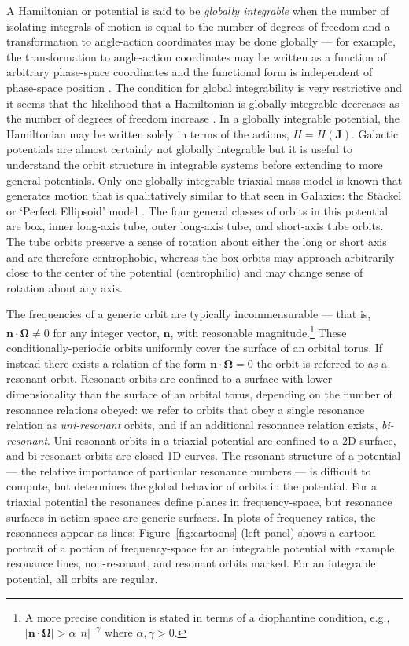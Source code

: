 \documentclass[letterpaper,12pt,preprint]{aastex}
\newcommand{\bs}[1]{\boldsymbol{#1}}
\begin{document}
A Hamiltonian or potential is said to be \emph{globally integrable} when the number of isolating integrals of motion is equal to the number of degrees of freedom and a transformation to angle-action coordinates may be done globally --- for example, the transformation to angle-action coordinates may be written as a function of arbitrary phase-space coordinates and the functional form is independent of phase-space position \citep[e.g.,][]{goldstein80}. The condition for global integrability is very restrictive and it seems that the likelihood that a Hamiltonian is globally integrable decreases as the number of degrees of freedom increase \citep[e.g.,][]{lichtenberg83}. In a globally integrable potential, the Hamiltonian may be written solely in terms of the actions, $H = H(\boldsymbol{J})$. Galactic potentials are almost certainly not globally integrable but it is useful to understand the orbit structure in integrable systems before extending to more general potentials. Only one globally integrable triaxial mass model is known that generates motion that is qualitatively similar to that seen in Galaxies: the St\"ackel or `Perfect Ellipsoid' model \citep[e.g.,][]{kuzmin73, deZeeuw85}. The four general classes of orbits in this potential are box, inner long-axis tube, outer long-axis tube, and short-axis tube orbits. The tube orbits preserve a sense of rotation about either the long or short axis and are therefore centrophobic, whereas the box orbits may approach arbitrarily close to the center of the potential (centrophilic) and may change sense of rotation about any axis.

The frequencies of a generic orbit are typically incommensurable --- that is, $\bs{n} \cdot \bs{\Omega} \neq 0$ for any integer vector, $\bs{n}$, with reasonable magnitude.\footnote{A more precise condition is stated in terms of a diophantine condition, e.g., $|\bs{n} \cdot \boldsymbol{\Omega}| > \alpha \, |n|^{-\gamma}$ where $\alpha, \gamma>0$.} These conditionally-periodic orbits uniformly cover the surface of an orbital torus. If instead there exists a relation of the form $\boldsymbol{n} \cdot \boldsymbol{\Omega} = 0$ the orbit is referred to as a resonant orbit. Resonant orbits are confined to a surface with lower dimensionality than the surface of an orbital torus, depending on the number of resonance relations obeyed: we refer to orbits that obey a single resonance relation as \emph{uni-resonant} orbits, and if an additional resonance relation exists, \emph{bi-resonant}. Uni-resonant orbits in a triaxial potential are confined to a 2D surface, and bi-resonant orbits are closed 1D curves. The resonant structure of a potential --- the relative importance of particular resonance numbers --- is difficult to compute, but determines the global behavior of orbits in the potential. For a triaxial potential the resonances define planes in frequency-space, but resonance surfaces in action-space are generic surfaces. In plots of frequency ratios, the resonances appear as lines; Figure~\ref{fig:cartoons} (left panel) shows a cartoon portrait of a portion of frequency-space for an integrable potential with example resonance lines, non-resonant, and resonant orbits marked. For an integrable potential, all orbits are regular.
\end{document}
